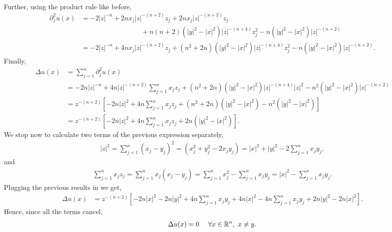 \begin{questions}
\begin{solution}
\begin{align*}
\end{align*}
Further, using the product rule like before,
\begin{align*}
\partial^2_ju(x)&=-2|z|^{-n}+2nx_j|z|^{-(n+2)}z_j+2nx_j|z|^{-(n+2)}z_j\\
&~~~~~~~~~~~~~~~~~~~~~~~~~~~~~~~~~~~~~~~~+n(n+2)\left(|y|^2-|x|^2\right)|z|^{-(n+4)}z^2_j-n\left(|y|^2-|x|^2\right)|z|^{-(n+2)}\\
&=-2|z|^{-n}+4nx_j|z|^{-(n+2)}z_j+(n^2+2n)\left(|y|^2-|x|^2\right)|z|^{-(n+4)}z^2_j-n\left(|y|^2-|x|^2\right)|z|^{-(n+2)}.
\end{align*}
Finally,
\begin{align*}
\Delta u(x)&=\sum_{j=1}^n\partial^2_ju(x)\\
&=-2n|z|^{-n}+4n|z|^{-(n+2)}\sum_{j=1}^nx_jz_j+(n^2+2n)\left(|y|^2-|x|^2\right)|z|^{-(n+4)}|z|^2-n^2\left(|y|^2-|x|^2\right)|z|^{-(n+2)}\\
&=z^{-(n+2)}\left[-2n|z|^2+4n\sum_{j=1}^nx_jz_j+(n^2+2n)\left(|y|^2-|x|^2\right)-n^2\left(|y|^2-|x|^2\right)\right]\\
&=z^{-(n+2)}\left[-2n|z|^2+4n\sum_{j=1}^nx_jz_j+2n\left(|y|^2-|x|^2\right)\right].
\end{align*}
We stop now to calculate two terms of the previous expression separately,
\begin{align*}
|z|^2=\sum_{j=1}^n(x_j-y_j)^2=(x^2_j+y^2_j-2x_jy_j)=|x|^2+|y|^2-2\sum_{j=1}^nx_jy_j,
\end{align*}
and
\begin{align*}
\sum_{j=1}^nx_jz_j=\sum_{j=1}^nx_j(x_j-y_j)=\sum_{j=1}^nx_j^2-\sum_{j=1}^nx_jy_j=|x|^2-\sum_{j=1}^nx_jy_j.
\end{align*}
Plugging the previous results in we get,
\begin{align*}
\Delta u(x)&=z^{-(n+2)}\left[-2n|x|^2-2n|y|^2+4n\sum_{j=1}^nx_jy_j+4n|x|^2-4n\sum_{j=1}^nx_jy_j+2n|y|^2-2n|x|^2\right].
\end{align*}
Hence, since all the terms cancel,
\begin{align*}
\Delta u(x)=0~~~~\forall x\in\mathbb{R}^n,~x\neq y.
\end{align*}

\end{solution}
\end{questions}